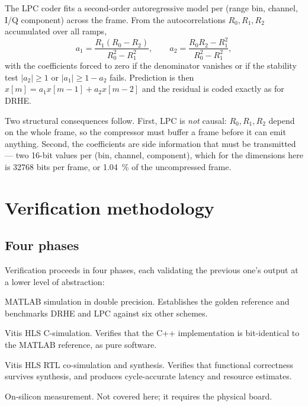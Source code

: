 \documentclass[10pt,twocolumn]{article}
\begin{document}
The LPC coder fits a second-order autoregressive model per (range bin, channel,
I/Q component) across the frame. From the autocorrelations
$R_0, R_1, R_2$ accumulated over all ramps,
\begin{equation}
\label{eq:yw}
a_1 = \frac{R_1(R_0 - R_2)}{R_0^2 - R_1^2}, \qquad
a_2 = \frac{R_0 R_2 - R_1^2}{R_0^2 - R_1^2},
\end{equation}
with the coefficients forced to zero if the denominator vanishes or if the
stability test $|a_2| \ge 1$ or $|a_1| \ge 1 - a_2$ fails. Prediction is then
$\hat{x}[m] = a_1 x[m-1] + a_2 x[m-2]$ and the residual is coded exactly as for
DRHE.

Two structural consequences follow. First, LPC is \emph{not} causal: $R_0,
R_1, R_2$ depend on the whole frame, so the compressor must buffer a frame
before it can emit anything. Second, the coefficients are side information that
must be transmitted --- two 16-bit values per (bin, channel, component), which
for the dimensions here is \num{32768} bits per frame, or \SI{1.04}{\percent} of
the uncompressed frame.

\section{Verification methodology}
\label{sec:method}

\subsection{Four phases}

Verification proceeds in four phases, each validating the previous one's output
at a lower level of abstraction:

\begin{description}\itemsep1pt
\item[Phase 1] MATLAB simulation in double precision. Establishes the golden
  reference and benchmarks DRHE and LPC against six other schemes.
\item[Phase 2] Vitis HLS C-simulation. Verifies that the C++ implementation is
  bit-identical to the MATLAB reference, as pure software.
\item[Phase 3] Vitis HLS RTL co-simulation and synthesis. Verifies that
  functional correctness survives synthesis, and produces cycle-accurate
  latency and resource estimates.
\item[Phase 4] On-silicon measurement. Not covered here; it requires the
  physical board.
\end{description}
\end{document}

